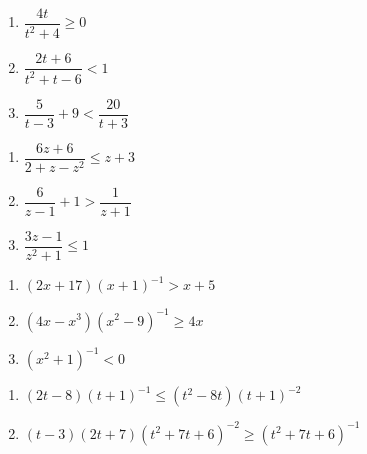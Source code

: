 \documentclass{ximera}
\begin{document}
\begin{multicols}{3}
\begin{enumerate}
\setcounter{enumi}{\value{HW}}


\item  $\dfrac{4t}{t^2+4} \geq 0$
\item  $\dfrac{2t+6}{t^2+t-6} < 1$
\item  $\dfrac{5}{t-3} + 9 < \dfrac{20}{t+3}$

\setcounter{HW}{\value{enumi}}
\end{enumerate}
\end{multicols}

\begin{multicols}{3}
\begin{enumerate}
\setcounter{enumi}{\value{HW}}


\item  $\dfrac{6z+6}{2+z-z^2} \leq z+3$
\item $\dfrac{6}{z-1} + 1 > \dfrac{1}{z+1}$
\item $\dfrac{3z - 1}{z^{2} + 1} \leq 1$

\setcounter{HW}{\value{enumi}}
\end{enumerate}
\end{multicols}

\begin{multicols}{3}
\begin{enumerate}
\setcounter{enumi}{\value{HW}}

\item $(2x+17)(x+1)^{-1} > x + 5$
\item $(4x-x^3)(x^{2} - 9)^{-1} \geq 4x$
\item $(x^{2} + 1)^{-1} < 0$ 

\setcounter{HW}{\value{enumi}}
\end{enumerate}
\end{multicols}

\begin{multicols}{2}
\begin{enumerate}
\setcounter{enumi}{\value{HW}}

\item $(2t-8)(t+1)^{-1} \leq (t^2-8t)(t+1)^{-2}$ %
\item $(t-3)(2t+7)(t^2+7t+6)^{-2} \geq (t^2+7t+6)^{-1}$ %

\setcounter{HW}{\value{enumi}}
\end{enumerate}
\end{multicols}
\end{document}
